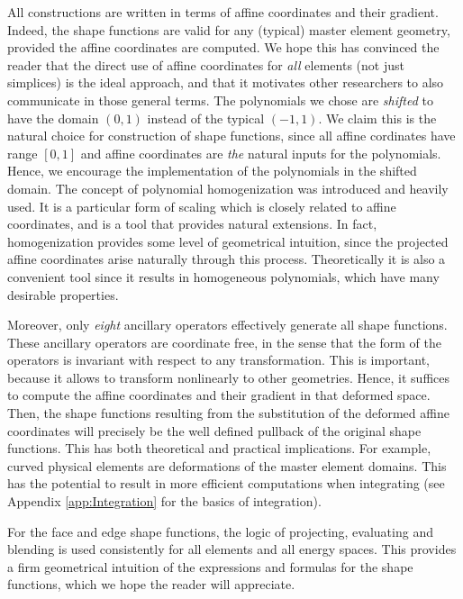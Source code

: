 All constructions are written in terms of affine coordinates and their gradient.
Indeed, the shape functions are valid for any (typical) master element geometry, provided the affine coordinates are computed.
We hope this has convinced the reader that the direct use of affine coordinates for \textit{all} elements (not just simplices) is the ideal approach, and that it motivates other researchers to also communicate in those general terms.
The polynomials we chose are \textit{shifted} to have the domain $(0,1)$ instead of the typical $(-1,1)$.
We claim this is the natural choice for construction of shape functions, since all affine cordinates have range $[0,1]$ and affine coordinates are \textit{the} natural inputs for the polynomials.
Hence, we encourage the implementation of the polynomials in the shifted domain.
The concept of polynomial homogenization was introduced and heavily used.
It is a particular form of scaling which is closely related to affine coordinates, and is a tool that provides natural extensions.
In fact, homogenization provides some level of geometrical intuition, since the projected affine coordinates arise naturally through this process.
Theoretically it is also a convenient tool since it results in homogeneous polynomials, which have many desirable properties.

Moreover, only \textit{eight} ancillary operators effectively generate all shape functions.
These ancillary operators are coordinate free, in the sense that the form of the operators is invariant with respect to any transformation. 
This is important, because it allows to transform nonlinearly to other geometries.
Hence, it suffices to compute the affine coordinates and their gradient in that deformed space.
Then, the shape functions resulting from the substitution of the deformed affine coordinates will precisely be the well defined pullback of the original shape functions.
This has both theoretical and practical implications.
For example, curved physical elements are deformations of the master element domains. 
This has the potential to result in more efficient computations when integrating (see Appendix \ref{app:Integration} for the basics of integration).

For the face and edge shape functions, the logic of projecting, evaluating and blending is used consistently for all elements and all energy spaces.
This provides a firm geometrical intuition of the expressions and formulas for the shape functions, which we hope the reader will appreciate.

